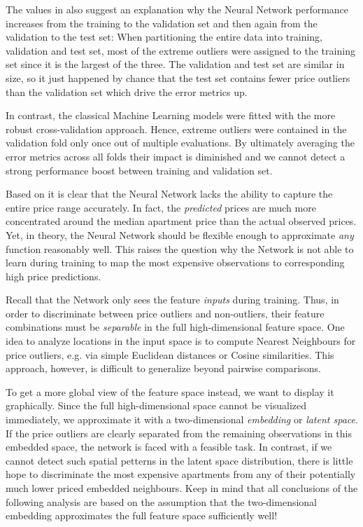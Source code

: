 The values in  also suggest an explanation why the Neural Network performance increases from the training to the validation set and then again from the validation to the test set:
When partitioning the entire data into training, validation and test set, most of the extreme outliers were assigned to the training set since it is the largest of the three.
The validation and test set are similar in size, so it just happened by chance that the test set contains fewer price outliers than the validation set which drive the error metrics up.

In contrast, the classical Machine Learning models were fitted with the more robust cross-validation approach.
Hence, extreme outliers were contained in the validation fold only once out of multiple evaluations.
By ultimately averaging the error metrics across all folds their impact is diminished and we cannot detect a strong performance boost between training and validation set.

Based on  it is clear that the Neural Network lacks the ability to capture the entire price range accurately.
In fact, the \emph{predicted} prices are much more concentrated around the median apartment price than the actual observed prices.
Yet, in theory, the Neural Network should be flexible enough to approximate \emph{any} function reasonably well.
This raises the question why the Network is not able to learn during training to map the most expensive observations to corresponding high price predictions.

Recall that the Network only sees the feature \emph{inputs} during training.
Thus, in order to discriminate between price outliers and non-outliers, their feature combinations must be \emph{separable} in the full high-dimensional feature space.
One idea to analyze locations in the input space is to compute Nearest Neighbours for price outliers, e.g. via simple Euclidean distances or Cosine similarities.
This approach, however, is difficult to generalize beyond pairwise comparisons.

To get a more global view of the feature space instead, we want to display it graphically.
Since the full high-dimensional space cannot be visualized immediately, we approximate it with a two-dimensional \emph{embedding} or \emph{latent space}.
If the price outliers are clearly separated from the remaining observations in this embedded space, the network is faced with a feasible task.
In contrast, if we cannot detect such spatial petterns in the latent space distribution, there is little hope to discriminate the most expensive apartments from any of their potentially much lower priced embedded neighbours.
Keep in mind that all conclusions of the following analysis are based on the assumption that the two-dimensional embedding approximates the full feature space sufficiently well!

